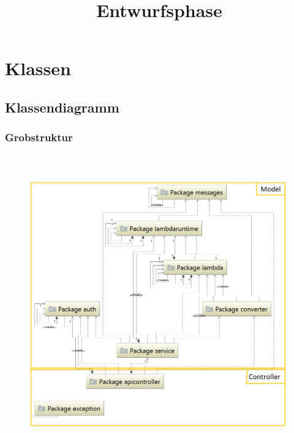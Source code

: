 \documentclass[a4paper,20pt,oneside]{book}
\begin{document}
	\title{\Huge{\bfseries{Entwurfsphase}}}
	\author{}
	\maketitle
	\clearpage
	
	\tableofcontents
	
	\chapter{Klassen}
	\section{Klassendiagramm}
	\subsection{Grobstruktur}
	    \begin{figure}[!hb]
	    	\includegraphics[width=18cm,height=13cm]{globaldiagram}
	    \end{figure}	
    \clearpage
    
\end{document}
